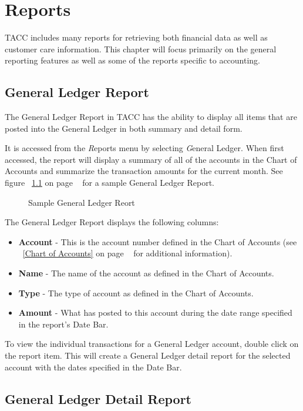 \chapter{Reports}

TACC includes many reports for retrieving both financial data as well as
customer care information.  This chapter will focus primarily on the
general reporting features as well as some of the reports specific to
accounting.



\section{General Ledger Report}

The General Ledger Report in TACC has the ability to display all items
that are posted into the General Ledger in both summary and detail form.

It is accessed from the {\emph Reports} menu by selecting {\emph General
Ledger}.  When first accessed, the report will display a summary of all
of the accounts in the Chart of Accounts and summarize the transaction
amounts for the current month.  See figure
~\ref{fig:GeneralLedgerReport} on page
~\pageref{fig:GeneralLedgerReport} for a sample General Ledger Report.

\begin{figure}[hbtp]
\caption{ \label{fig:GeneralLedgerReport} Sample General Ledger Reort}
\end{figure}

The General Ledger Report displays the following columns:
\begin{itemize}
\item {\bf Account} - This is the account number defined in the Chart of
Accounts (see ~\ref{Chart of Accounts} on page ~\pageref{Chart of Accounts}
for additional information).
\item {\bf Name} - The name of the account as defined in the Chart of
Accounts.
\item {\bf Type} - The type of account as defined in the Chart of
Accounts.
\item {\bf Amount} - What has posted to this account during the date
range specified in the report's Date Bar.
\end{itemize}

To view the individual transactions for a General Ledger account, double
click on the report item.  This will create a General Ledger detail
report for the selected account with the dates specified in the Date
Bar.

\section{General Ledger Detail Report}

